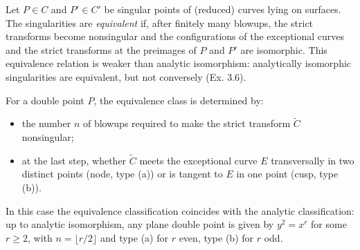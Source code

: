 Let $P \in C$ and $P' \in C'$ be singular points of (reduced) curves lying on surfaces. The singularities are \textit{equivalent} if, after finitely many blowups, the strict transforms become nonsingular and the configurations of the exceptional curves and the strict transforms at the preimages of $P$ and $P'$ are isomorphic. This equivalence relation is weaker than analytic isomorphism: analytically isomorphic singularities are equivalent, but not conversely (Ex. 3.6).

For a double point $P$, the equivalence class is determined by:
\begin{itemize}
\item the number $n$ of blowups required to make the strict transform $\tilde{C}$ nonsingular;
\item at the last step, whether $\tilde{C}$ meets the exceptional curve $E$ transversally in two distinct points (node, type (a)) or is tangent to $E$ in one point (cusp, type (b)).
\end{itemize}
In this case the equivalence classification coincides with the analytic classification: up to analytic isomorphism, any plane double point is given by $y^2 = x^r$ for some $r \geqslant 2$, with $n = \lfloor r/2 \rfloor$ and type (a) for $r$ even, type (b) for $r$ odd.
